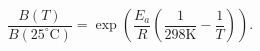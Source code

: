 \documentclass[preview]{standalone}
\begin{document}
\[
\frac{B(T)}{B(25^\circ\mathrm{C})} = \exp\left(\frac{E_a}{R}\left(\frac{1}{298\mathrm{K}} - \frac{1}{T}\right)\right).
\]
\end{document}
